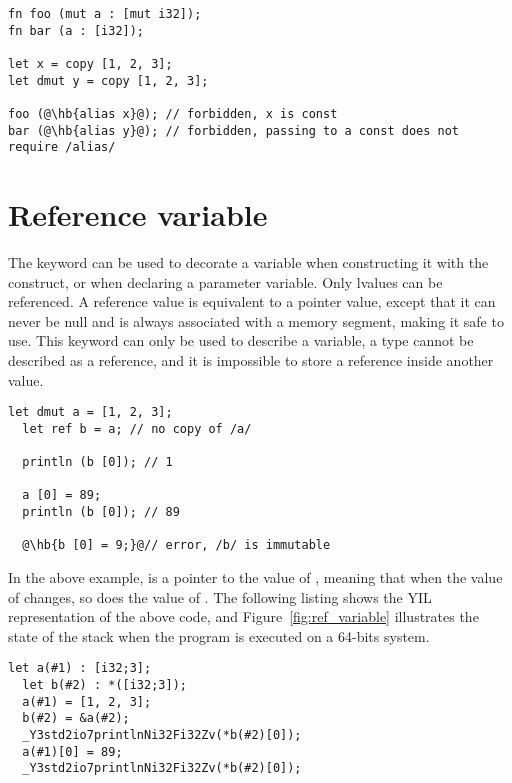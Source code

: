 \begin{lstlisting}[style=coloredverbatim, escapechar=@]
fn foo (mut a : [mut i32]);
fn bar (a : [i32]);

let x = copy [1, 2, 3];
let dmut y = copy [1, 2, 3];

foo (@\hb{alias x}@); // forbidden, x is const
bar (@\hb{alias y}@); // forbidden, passing to a const does not require /alias/
\end{lstlisting}

\vfill%
\pagebreak

\section {Reference variable}
\label{sec:ref_variable}

The  keyword can be used to decorate a variable when constructing it
with the  construct, or when declaring a parameter variable. Only
lvalues can be referenced. A reference value is equivalent to a pointer value,
except that it can never be null and is always associated with a memory segment,
making it safe to use. This keyword can only be used to describe a variable, a
type cannot be described as a reference, and it is impossible to store a
reference inside another value.

\begin{lstlisting}[style=coloredverbatim, escapechar=@]
  let dmut a = [1, 2, 3];
  let ref b = a; // no copy of /a/

  println (b [0]); // 1

  a [0] = 89;
  println (b [0]); // 89

  @\hb{b [0] = 9;}@// error, /b/ is immutable
\end{lstlisting}

In the above example,  is a pointer to the value of ,
meaning that when the value of  changes, so does the value of
. The following listing shows the YIL representation of the above
code, and Figure~\ref{fig:ref_variable} illustrates the state of the stack when the
program is executed on a 64-bits system.

\begin{lstlisting}[style=intermediateVerb]
  let a(#1) : [i32;3];
  let b(#2) : *([i32;3]);
  a(#1) = [1, 2, 3];
  b(#2) = &a(#2);
  _Y3std2io7printlnNi32Fi32Zv(*b(#2)[0]);
  a(#1)[0] = 89;
  _Y3std2io7printlnNi32Fi32Zv(*b(#2)[0]);
\end{lstlisting}

